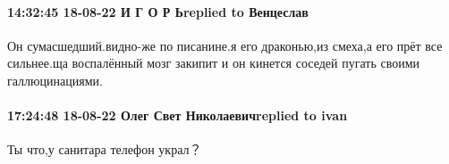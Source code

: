 
 
 
 
 

\paragraph{14:32:45 18-08-22 И Г О Р Ьreplied to Венцеслав}

Он сумасшедший.видно-же по писанине.я его драконью,из смеха,а его прёт все
сильнее.ща воспалённый мозг закипит и он кинется соседей пугать своими
галлюцинациями.

\paragraph{17:24:48 18-08-22 Олег Свет Николаевичreplied to ivan}

Ты что,у санитара телефон украл？
